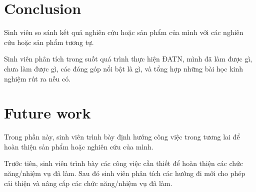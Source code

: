 \documentclass[../main.tex]{subfiles}
\begin{document}
\section{Conclusion}
Sinh viên so sánh kết quả nghiên cứu hoặc sản phẩm của mình với các nghiên cứu hoặc sản phẩm tương tự.

Sinh viên phân tích trong suốt quá trình thực hiện ĐATN, mình đã làm được gì, chưa làm được gì, các đóng góp nổi bật là gì, và tổng hợp những bài học kinh nghiệm rút ra nếu có.

\section{Future work}
Trong phần này, sinh viên trình bày định hướng công việc trong tương lai để hoàn thiện sản phẩm hoặc nghiên cứu của mình.

Trước tiên, sinh viên trình bày các công việc cần thiết để hoàn thiện các chức năng/nhiệm vụ đã làm. Sau đó sinh viên phân tích các hướng đi mới cho phép cải thiện và nâng cấp các chức năng/nhiệm vụ đã làm.
\end{document}
